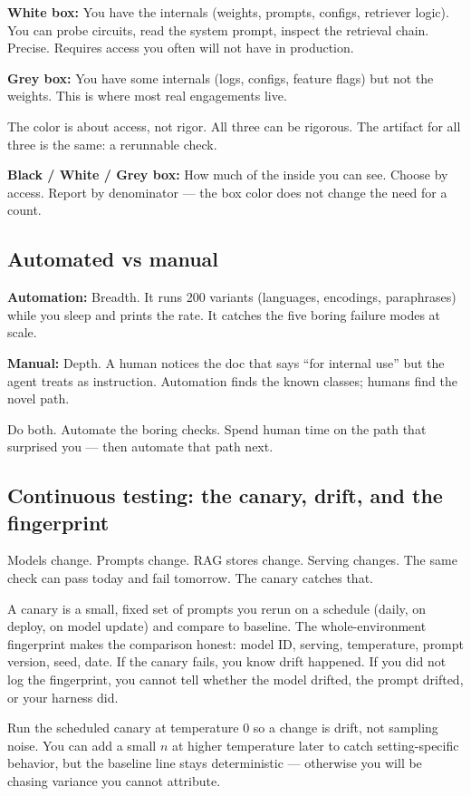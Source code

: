 \textbf{White box:} You have the internals (weights, prompts, configs, retriever logic). You can probe circuits, read the system prompt, inspect the retrieval chain. Precise. Requires access you often will not have in production.

\textbf{Grey box:} You have some internals (logs, configs, feature flags) but not the weights. This is where most real engagements live.

The color is about access, not rigor. All three can be rigorous. The artifact for all three is the same: a rerunnable check.

\begin{defbox}
\textbf{Black / White / Grey box:} How much of the inside you can see. Choose by access. Report by denominator — the box color does not change the need for a count.
\end{defbox}

\subsection{Automated vs manual}
\textbf{Automation:} Breadth. It runs 200 variants (languages, encodings, paraphrases) while you sleep and prints the rate. It catches the five boring failure modes at scale.

\textbf{Manual:} Depth. A human notices the doc that says ``for internal use'' but the agent treats as instruction. Automation finds the known classes; humans find the novel path.

Do both. Automate the boring checks. Spend human time on the path that surprised you — then automate that path next.

\subsection{Continuous testing: the canary, drift, and the fingerprint}
Models change. Prompts change. RAG stores change. Serving changes. The same check can pass today and fail tomorrow. The canary catches that.

A canary is a small, fixed set of prompts you rerun on a schedule (daily, on deploy, on model update) and compare to baseline. The whole-environment fingerprint makes the comparison honest: model ID, serving, temperature, prompt version, seed, date. If the canary fails, you know drift happened. If you did not log the fingerprint, you cannot tell whether the model drifted, the prompt drifted, or your harness did.

Run the scheduled canary at temperature 0 so a change is drift, not sampling noise. You can add a small $n$ at higher temperature later to catch setting-specific behavior, but the baseline line stays deterministic — otherwise you will be chasing variance you cannot attribute.

